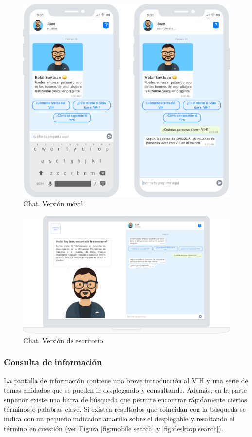 \begin{figure}[htbp]
\centering
\includegraphics[scale=0.2]{../images/mobile_chat.png} 
\caption{Chat. Versión móvil}
\label{fig:mobile chat}
\end{figure}

\begin{figure}[htbp]
\centering
\includegraphics[scale=0.2]{../images/desktop_chat.png} 
\caption{Chat. Versión de escritorio}
\label{fig:desktop chat}
\end{figure}


\subsubsection{Consulta de información}
La pantalla de información contiene una breve introducción al VIH y una serie de temas anidados que se pueden ir desplegando y consultando. Además, en la parte superior existe una barra de búsqueda que permite encontrar rápidamente ciertos términos o palabras clave. Si existen resultados que coincidan con la búsqueda se indica con un pequeño indicador amarillo sobre el desplegable y resaltando el término en cuestión (ver Figura \ref{fig:mobile search} y \ref{fig:desktop search}).\\

